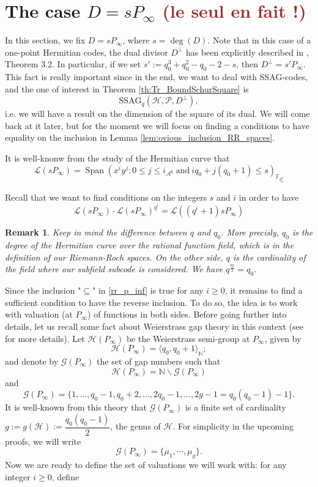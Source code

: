 \documentclass[a4paper]{article}
\newtheorem{rq1}{Remark}
\newcommand{\calA}{\mathcal{A}}
\newcommand{\calP}{\mathcal{P}}
\newcommand{\calH}{\mathcal{H}}
\newcommand{\calL}{\mathcal{L}}
\newcommand{\Span}[1]{\operatorname{Span}\left(#1\right)}
\newcommand\mathieu[1]{\textcolor{brown}{#1}}
\begin{document}
\section{The case $D=sP_{\infty}$ \mathieu{(le seul en fait !)}}

In this section, we fix $D=sP_{\infty}$, where $s=\deg(D)$. Note that in this case of a one-point Hermitian codes, the dual divisor $D^{\perp}$ has been explicitly described in \cite{sabi}, Theorem 3.2. In particular, if we set $s' := q_0^3+q_0^2-q_0-2-s$, then $D^{\perp} = s'P_{\infty}$. This fact is really important since in the end, we want to deal with \textrm{SSAG}-codes, and the one of interest in Theorem \ref{th:Tr_BoundSchurSquare} is 
\[\mathrm{SSAG}_{q}(\calH,\calP,D^{\perp}),\]
i.e. we will have a result on the dimension of the square of its dual. We will come back at it later, but for the moment we will focus on finding a conditions to have equality on the inclusion in Lemma \ref{lem:ovious_inclusion_RR_spaces}. 

\noindent It is well-knonw from the study of the Hermitian curve that
\begin{equation} \label{rr_p_inf}
\calL(sP_{\infty}) = \Span{x^iy^j : 0 \leq j \leq i_{\calA^k} \ \mathrm{and} \ iq_0+j(q_0+1) \leq s}_{\mathbb{F}_{q_0^2}}
\end{equation}

Recall that we want to find conditions on the integers $s$ and $i$ in order to have 
\begin{equation} \label{equality}
\calL(sP_{\infty}) \cdot \calL(sP_{\infty})^{q^i} = \calL((q^i+1)sP_{\infty})  
\end{equation}

\begin{rq1}
Keep in mind the difference between $q$ and $q_0$. More precisly, $q_0$ is the degree of the Hermitian curve over the rational function field, which is in the definition of our Riemann-Roch spaces. On the other side, $q$ is the cardinality of the field where our subfield subcode is considered. We have $q^{\frac{m}{2}}=q_0$.
\end{rq1}

Since the inclusion "$\subseteq$" in \eqref{rr_p_inf} is true for any $i \geq 0$, it remains to find a sufficient condition to have the reverse inclusion. To do so, the idea is to work with valuation (at $P_{\infty}$) of functions in both sides. Before going further into details, let us recall some fact about Weierstrass gap theory in this context (see \cite{sti} for more details).
Let $\calH(P_{\infty})$ be the Weierstrass semi-group at $P_{\infty}$, given by
\[\calH(P_{\infty}) = \langle q_0,q_0+1 \rangle_{\mathbb{N}};\]
and denote by  $\mathcal{G}(P_{\infty})$ the set of gap numbers such that
\[\calH(P_{\infty}) = \mathbb{N} \backslash \mathcal{G}(P_{\infty})\]
and 
\[\mathcal{G}(P_{\infty}) = \{1,...,q_0-1,q_0+2,...,2q_0-1,...,2g-1=q_0(q_0-1)-1\}.\]
It is well-known from this theory that $\mathcal{G}(P_{\infty})$ is a finite set of cardinality $g:=g(\calH) := \dfrac{q_0(q_0-1)}{2}$, the genus of $\calH$. For simplicity in the upcoming proofs, we will write 
\[\mathcal{G}(P_{\infty}) = \{\mu_1,\cdots,\mu_g\}.\]
Now we are ready to define the set of valuations we will work with: for any integer $i \geq 0$, define
\end{document}

